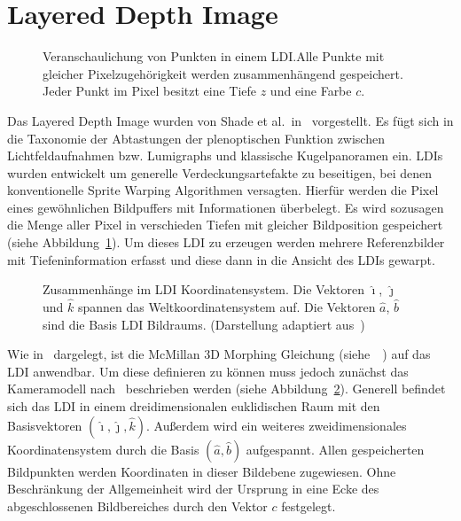 \documentclass[hyperref, beleg, german, final, twoside]{cgvpub}
\begin{document}
\section{Layered Depth Image}

\begin{figure}
	\centering
	
	\caption{Veranschaulichung von Punkten in einem LDI.\@ Alle Punkte mit
		gleicher Pixelzugehörigkeit werden zusammenhängend gespeichert. Jeder
		Punkt im Pixel besitzt eine Tiefe \(z\) und eine Farbe \(c\).}%
	\label{fig:layereddepthimage}
\end{figure}

Das Layered Depth Image wurden von Shade et al.\ in~\cite{he1998layered}
vorgestellt. Es fügt sich in die Taxonomie der Abtastungen der plenoptischen
Funktion zwischen Lichtfeldaufnahmen bzw. Lumigraphs und klassische
Kugelpanoramen ein. LDIs wurden entwickelt um generelle Verdeckungsartefakte zu
beseitigen, bei denen konventionelle Sprite Warping Algorithmen versagten.
Hierfür werden die Pixel eines gewöhnlichen Bildpuffers mit Informationen
überbelegt. Es wird sozusagen die Menge aller Pixel in verschieden Tiefen mit
gleicher Bildposition gespeichert (siehe
Abbildung~\ref{fig:layereddepthimage}). Um dieses LDI zu erzeugen werden
mehrere Referenzbilder mit Tiefeninformation erfasst und diese dann in die
Ansicht des LDIs gewarpt.

\begin{figure}
	\centering
	
	\caption{Zusammenhänge im LDI Koordinatensystem. Die Vektoren \( \hat{\imath}
		\), \( \hat{\jmath} \) und \( \hat{k} \) spannen das Weltkoordinatensystem
		auf. Die Vektoren \( \hat{a} \), \( \hat{b} \) sind die Basis LDI
		Bildraums. (Darstellung adaptiert aus~\cite{mcmillan1997image})}%
	\label{fig:ldicoord}
\end{figure}

Wie in~\cite{chang1999ldi} dargelegt, ist die McMillan 3D Morphing Gleichung
(siehe~\cite{mcmillan1995list}~\cite{mcmillan1995plenoptic}) auf das LDI
anwendbar. Um diese definieren zu können muss jedoch zunächst das Kameramodell
nach~\cite{mcmillan1997image} beschrieben werden (siehe
Abbildung~\ref{fig:ldicoord}). Generell befindet sich das LDI in einem
dreidimensionalen euklidischen Raum mit den Basisvektoren \( (\hat{\imath},
\hat{\jmath}, \hat{k}) \). Außerdem wird ein weiteres zweidimensionales
Koordinatensystem durch die Basis \( (\hat{a}, \hat{b}) \) aufgespannt. Allen
gespeicherten Bildpunkten werden Koordinaten in dieser Bildebene zugewiesen.
Ohne Beschränkung der Allgemeinheit wird der Ursprung in eine Ecke des
abgeschlossenen Bildbereiches durch den Vektor \( c \) festgelegt.
\end{document}
